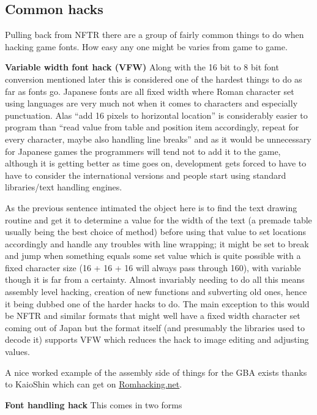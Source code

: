 \documentclass[
]{book}
\begin{document}
\hypertarget{common-hacks}{%
\subsection{Common hacks}\label{common-hacks}}

Pulling back from NFTR there are a group of fairly common things to do when hacking game fonts. How easy any one might be varies from game to game.

\textbf{Variable width font hack (VFW)} Along with the 16 bit to 8 bit font conversion mentioned later this is considered one of the hardest things to do as far as fonts go. Japanese fonts are all fixed width where Roman character set using languages are very much not when it comes to characters and especially punctuation. Alas ``add 16 pixels to horizontal location'' is considerably easier to program than ``read value from table and position item accordingly, repeat for every character, maybe also handling line breaks'' and as it would be unnecessary for Japanese games the programmers will tend not to add it to the game, although it is getting better as time goes on, development gets forced to have to have to consider the international versions and people start using standard libraries/text handling engines.

As the previous sentence intimated the object here is to find the text drawing routine and get it to determine a value for the width of the text (a premade table usually being the best choice of method) before using that value to set locations accordingly and handle any troubles with line wrapping; it might be set to break and jump when something equals some set value which is quite possible with a fixed character size (16 + 16 + 16 will always pass through 160), with variable though it is far from a certainty. Almost invariably needing to do all this means assembly level hacking, creation of new functions and subverting old ones, hence it being dubbed one of the harder hacks to do. The main exception to this would be NFTR and similar formats that might well have a fixed width character set coming out of Japan but the format itself (and presumably the libraries used to decode it) supports VFW which reduces the hack to image editing and adjusting values.

A nice worked example of the assembly side of things for the GBA exists thanks to KaioShin which can get on \href{http://www.romhacking.net/documents/337/}{Romhacking.net}.

\textbf{Font handling hack} This comes in two forms
\end{document}
